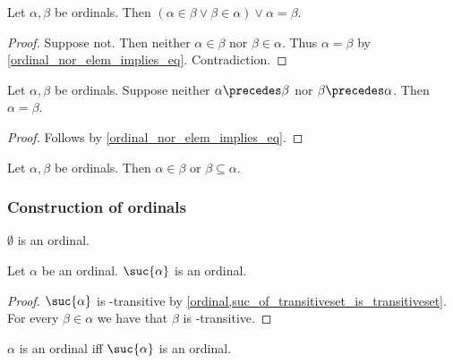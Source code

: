 \begin{proposition}\label{ordinal_in_trichotomy}
    Let $\alpha,\beta$ be ordinals. Then $(\alpha\in\beta \lor \beta\in\alpha) \lor \alpha = \beta$.
\end{proposition}
\begin{proof}
    Suppose not.
    Then neither $\alpha\in\beta$ nor $\beta\in\alpha$.
    Thus $\alpha = \beta$ by \cref{ordinal_nor_elem_implies_eq}. Contradiction.
\end{proof}

\begin{corollary}\label{ordinal_prec_trichotomy}
    Let $\alpha,\beta$ be ordinals.
    Suppose neither $\alpha\precedes\beta$ nor $\beta\precedes\alpha$.
    Then $\alpha = \beta$.
\end{corollary}
\begin{proof}
    Follows by \cref{ordinal_nor_elem_implies_eq}.
\end{proof}

\begin{corollary}\label{ordinal_elem_or_superset}
    Let $\alpha,\beta$ be ordinals. Then $\alpha\in \beta$ or $\beta\subseteq \alpha$.
\end{corollary}



\subsubsection{Construction of ordinals}

\begin{proposition}\label{emptyset_is_ordinal}
    $\emptyset$ is an ordinal.
\end{proposition}

\begin{proposition}\label{suc_ordinal}
    Let $\alpha$ be an ordinal.
    $\suc{\alpha}$ is an ordinal.
\end{proposition}
\begin{proof}
    $\suc{\alpha}$ is \in-transitive by \cref{ordinal,suc_of_transitiveset_is_transitiveset}.
    For every $\beta\in\alpha$ we have that $\beta$ is \in-transitive.
\end{proof}

\begin{proposition}\label{ordinal_iff_suc_ordinal}
    $\alpha$ is an ordinal iff $\suc{\alpha}$ is an ordinal.
\end{proposition}


